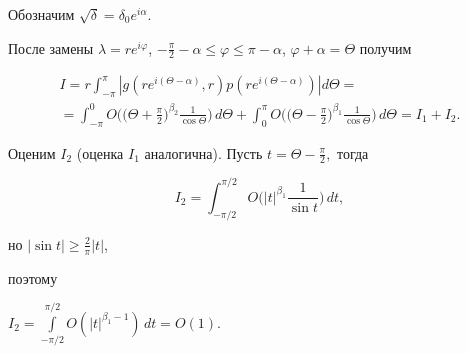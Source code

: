\begin{pf}


Обозначим $\sqrt{\delta}=\delta_0e^{i\alpha}.$


После замены $\lambda =re^{i\varphi}$, $-\frac {\pi}2-\alpha\le


\varphi\le\pi -\alpha$, $\varphi+\alpha=\Theta$ получим


\begin{multline*}


I=r\int_{-\pi}^{\pi}|g(re^{i(\Theta-\alpha)},r)


p(re^{i(\Theta-\alpha)})|d\Theta= \\


%


=\int_{-\pi}^0O\bigg(\bigg(\Theta+\frac{\pi}2\bigg)^{\beta _2}


\frac1{\cos\Theta}


\bigg)\,d\Theta+\int_0^{\pi}O\bigg(\bigg(\Theta-\frac{\pi}2


\bigg)^{\beta_1}\frac 1{\cos\Theta}\bigg)\,d\Theta


=I_1+I_2.


\end{multline*}


Оценим $I_2$ (оценка $I_1$ аналогична). Пусть $t=\Theta-\frac{\pi}2,$ тогда


$$


I_2=\int_{-\pi/2}^{\pi/2}O\bigg(|t|^{\beta_1}\frac1{\sin t}


\bigg)\, dt,


$$


но $|\sin t|\ge\frac{2}{\pi}|t|$,


поэтому


$I_2=\int\limits_{-\pi/2}^{\pi/2}O(|t|^{\beta_1-1})\,dt=O(1)$.


\end{pf}


\medskip








